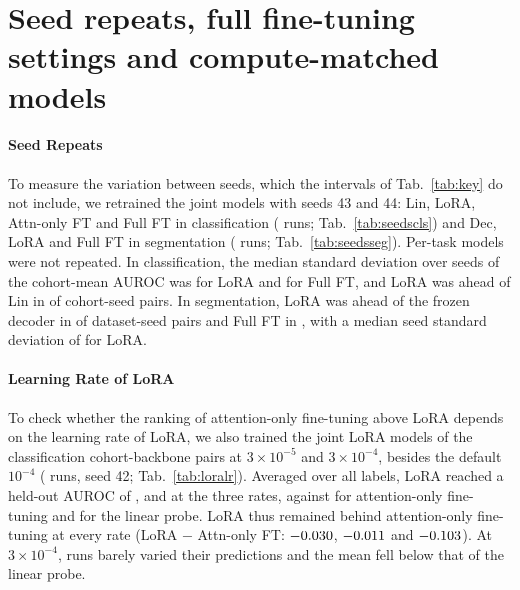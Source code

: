 \clearpage
\section{Seed repeats, full fine-tuning settings and compute-matched models}
\label{app:revision}

\paragraph{Seed Repeats} To measure the variation between seeds, which the intervals of Tab.~\ref{tab:key} do not include, we retrained the joint models with seeds 43 and 44: Lin, LoRA, Attn-only FT and Full FT in classification (\numSeedsclsRunsN{} runs; Tab.~\ref{tab:seedscls}) and Dec, LoRA and Full FT in segmentation (\numSeedssegRunsN{} runs; Tab.~\ref{tab:seedsseg}). Per-task models were not repeated. In classification, the median standard deviation over seeds of the cohort-mean AUROC was \numSeedsclsLoraSdmedian{} for LoRA and \numSeedsclsFullftSdmedian{} for Full FT, and LoRA was ahead of Lin in \numSeedsclsLoraLinAllPosN{} of \numSeedsclsLoraLinAllPairsN{} cohort-seed pairs. In segmentation, LoRA was ahead of the frozen decoder in \numSeedssegLoraDecAllPosN{} of \numSeedssegLoraDecAllPairsN{} dataset-seed pairs and Full FT in \numSeedssegFullftDecAllPosN{}, with a median seed standard deviation of \numSeedssegLoraSdmedian{} for LoRA.

\paragraph{Learning Rate of LoRA} To check whether the ranking of attention-only fine-tuning above LoRA depends on the learning rate of LoRA, we also trained the joint LoRA models of the \numLoralrPairsN{} classification cohort-backbone pairs at $3\times10^{-5}$ and $3\times10^{-4}$, besides the default $10^{-4}$ (\numLoralrRunsN{} runs, seed 42; Tab.~\ref{tab:loralr}). Averaged over all labels, LoRA reached a held-out AUROC of \numLoralrLowAllAuroc{}, \numLoralrDefAllAuroc{} and \numLoralrHighAllAuroc{} at the three rates, against \numLoralrRefAttnftAllAuroc{} for attention-only fine-tuning and \numLoralrRefLinAllAuroc{} for the linear probe. LoRA thus remained behind attention-only fine-tuning at every rate (LoRA $-$ Attn-only FT: $-0.030$, $-0.011$ and $-0.103$). At $3\times10^{-4}$, \numLoralrHighLowspreadN{} runs barely varied their predictions and the mean fell below that of the linear probe.

